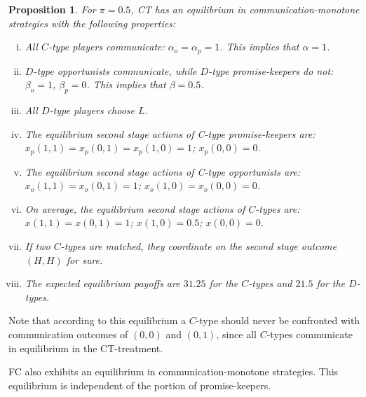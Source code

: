 \documentclass[12pt]{article}
\newtheorem{proposition}{Proposition} \theoremstyle{definition}
\theoremstyle{break}
\begin{document}
\begin{proposition}\label{prop:CT}
	For $\pi =0.5$, CT has an equilibrium in communication-monotone strategies with the following properties: 
	\begin{enumerate}[i)]\setlength\itemsep{0em}
		\item All $C$-type players communicate: $\alpha_o=\alpha_p=1$. This implies that $\alpha=1$.
		\item $D$-type opportunists communicate, while $D$-type promise-keepers do not: $\beta_o=1$, $\beta_p=0$. This implies that $\beta=0.5$.
		\item All $D$-type players choose $L$.
		\item The equilibrium second stage actions of C-type promise-keepers are:  $x_p(1,1)=x_p(0,1)=x_p(1,0)=1$; $x_p(0,0)=0$.
		\item The equilibrium second stage actions of C-type opportunists are: $x_o(1,1)=x_o(0,1)=1$; $x_o(1,0)=x_o(0,0)=0$.
		\item On average, the equilibrium second stage actions of $C$-types are: $x(1,1)=x(0,1)=1$; $x(1,0)=0.5$; $x(0,0)=0$.
		\item If two $C$-types are matched, they coordinate on the second stage outcome $(H,H)$ for sure.
		\item The expected equilibrium payoffs are $31.25$ for the $C$-types and $21.5$ for the $D$-types.
	\end{enumerate} 
\end{proposition} 

Note that according to this equilibrium a $C$-type should never be confronted with communication outcomes of $(0,0)$ and $(0,1)$, since all $C$-types communicate in equilibrium in the CT-treatment.

FC also exhibits an equilibrium in communication-monotone strategies. This equilibrium is independent of the portion of promise-keepers.
\end{document}
